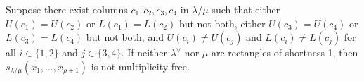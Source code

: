 \begin{prop}
\label{prop:4col}
Suppose there exist columns $c_1,c_2,c_3,c_4$ in $\lambda/\mu$ such that either $U(c_1)=U(c_2)$ or $L(c_1)=L(c_2)$ but not both, either $U(c_3)=U(c_4)$ or $L(c_3)=L(c_4)$ but not both, and $U(c_i)\not=U(c_j)$ and $L(c_i)\not=L(c_j)$ for all $i\in \{1,2\}$ and $j\in \{3,4\}$. If neither $\lambda^\vee$ nor $\mu$ are rectangles of shortness 1, then $s_{\lambda/\mu}(x_1,\ldots,x_{\rho+1})$ is not multiplicity-free.
\end{prop}

